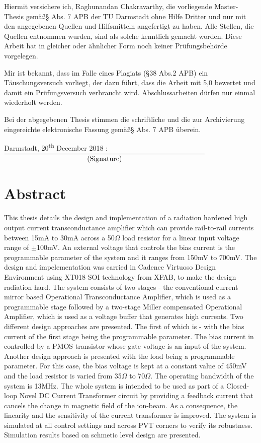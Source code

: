 \documentclass[linedtoc,
               parskip,
               twoside,
               longdoc,
               11pt,
               noheadingspace,
               accentcolor=tud1d,
               bigchapter,
               colorback]{tudreport}
\begin{document}
Hiermit versichere ich, Raghunandan Chakravarthy, die vorliegende Master-Thesis gem\"a\ss\enspace\S{} Abs. 7 APB der TU Darmstadt ohne Hilfe Dritter und nur mit den angegebenen Quellen und Hilfsmitteln angefertigt zu haben. Alle Stellen, die Quellen entnommen wurden, sind als solche kenntlich gemacht worden. Diese Arbeit hat in gleicher oder \"ahnlicher Form noch keiner Pr\"ufungsbeh\"orde vorgelegen.

Mir ist bekannt, dass im Falle eines Plagiats (\S38 Abs.2 APB) ein T\"auschungsversuch vorliegt, der dazu f\"uhrt, dass die Arbeit mit 5,0 bewertet und damit ein Pr\"ufungsversuch verbraucht wird. Abschlussarbeiten d\"urfen nur einmal wiederholt werden.

Bei der abgegebenen Thesis stimmen die schriftliche und die zur Archivierung eingereichte elektronische Fassung gem\"a\ss\enspace\S{} Abs. 7 APB \"uberein.
\hfill \break

Darmstadt, 20\textsuperscript{th} December 2018 : $\underset{\text{\normalsize(Signature)}}{\underline{\hspace{10cm}}}$

\chapter*{Abstract}
This thesis details the design and implementation of a radiation hardened high output current transconductance amplifier which can provide rail-to-rail currents between 15mA to 30mA across a 50$\Omega$ load resistor for a linear input voltage range of $\pm$100mV. An external voltage that controls the bias current is the programmable parameter of the system and it ranges from 150mV to 700mV. The design and impelementation was carried in Cadence Virtuoso Design Environment using XT018 SOI technology from XFAB, to make the design radiation hard. The system consists of two stages - the conventional current mirror based Operational Transconductance Amplifier, which is used as a programmable stage followed by a two-stage Miller compensated Operational Amplifier, which is used as a voltage buffer that generates high currents. Two different design approaches are presented. The first of which is - with the bias current of the first stage being the programmable parameter. The bias current in controlled by a PMOS transistor whose gate voltage is an input of the system. Another design approach is presented with the load being a programmable parameter. For this case, the bias voltage is kept at a constant value of 450mV and the load resistor is varied from 35$\Omega$ to 70$\Omega$. The operating bandwidth of the system is 13MHz. The whole system is intended to be used as part of a Closed-loop Novel DC Current Transformer circuit by providing a feedback current that cancels the change in magnetic field of the ion-beam. As a consequence, the linearity and the sensitivity of the current transformer is improved. The system is simulated at all control settings and across PVT corners to verify its robustness. Simulation results based on schmetic level design are presented.
\end{document}
